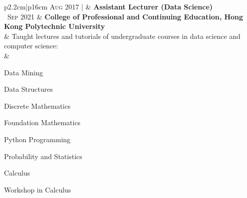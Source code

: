 \documentclass[10pt, oneside]{article}
\begin{document}
\begin{tabularx}{\linewidth}{p{2.2cm}|p{16cm}}
	\textsc{Aug} 2017 | & \textbf{Assistant Lecturer (Data Science)}\\
	\textsc{~Sep} 2021 & \textbf{College of Professional and Continuing Education, Hong Kong Polytechnic University}\\
	& Taught lectures and tutorials of undergraduate courses in data science and computer science:\\
	&	\begin{itemize}
		\vspace{0.2cm}
			\begin{minipage}{0.3\linewidth}
				
				\item Data Mining
				\item Data Structures
				\item Discrete Mathematics
				\item Foundation Mathematics
				
			\end{minipage}
			\begin{minipage}{0.3\linewidth}
				
				\item Python Programming 
				\item Probability and Statistics
				\item Calculus
				\item Workshop in Calculus
			

\end{minipage}
\end{itemize}
\end{tabularx}
\end{document}
